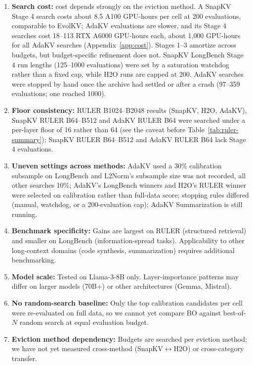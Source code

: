 \documentclass[11pt]{article}
\begin{document}
\begin{enumerate}
\item \textbf{Search cost:} cost depends strongly on the eviction method. A SnapKV Stage 4 search costs about 8.5 A100 GPU-hours per cell at 200 evaluations, comparable to EvolKV; AdaKV evaluations are slower, and its Stage 4 searches cost 18--113 RTX A6000 GPU-hours each, about 1{,}000 GPU-hours for all AdaKV searches (Appendix~\ref{app:cost}). Stages 1--3 amortize across budgets, but budget-specific refinement does not. SnapKV LongBench Stage 4 run lengths (125--1000 evaluations) were set by a saturation watchdog rather than a fixed cap, while H2O runs are capped at 200. AdaKV searches were stopped by hand once the archive had settled or after a crash (97--359 evaluations; one reached 1000).
\item \textbf{Floor consistency:} RULER B1024--B2048 results (SnapKV, H2O, AdaKV), SnapKV RULER B64--B512 and AdaKV RULER B64 were searched under a per-layer floor of 16 rather than 64 (see the caveat before Table~\ref{tab:ruler-summary}); SnapKV RULER B64--B512 and AdaKV RULER B64 lack Stage 4 evaluations.
\item \textbf{Uneven settings across methods:} AdaKV used a 30\% calibration subsample on LongBench and L2Norm's subsample size was not recorded, all other searches 10\%; AdaKV's LongBench winners and H2O's RULER winner were selected on calibration rather than full-data score; stopping rules differed (manual, watchdog, or a 200-evaluation cap); AdaKV Summarization is still running.
\item \textbf{Benchmark specificity:} Gains are largest on RULER (structured retrieval) and smaller on LongBench (information-spread tasks). Applicability to other long-context domains (code synthesis, summarization) requires additional benchmarking.
\item \textbf{Model scale:} Tested on Llama-3-8B only. Layer-importance patterns may differ on larger models (70B+) or other architectures (Gemma, Mistral).
\item \textbf{No random-search baseline:} Only the top calibration candidates per cell were re-evaluated on full data, so we cannot yet compare BO against best-of-$N$ random search at equal evaluation budget.
\item \textbf{Eviction method dependency:} Budgets are searched per eviction method; we have not yet measured cross-method (SnapKV$\leftrightarrow$H2O) or cross-category transfer.
\end{enumerate}
\end{document}

